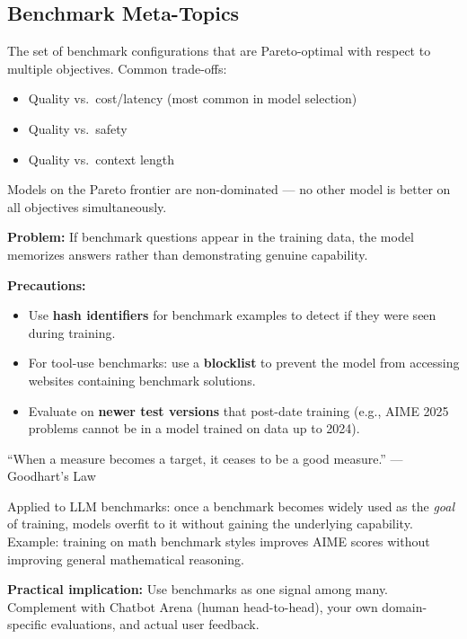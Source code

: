 \documentclass[11pt, a4paper]{article}
\begin{document}
\subsection{Benchmark Meta-Topics}

\begin{defbox}
The set of benchmark configurations that are Pareto-optimal with respect to multiple objectives. Common trade-offs:
\begin{itemize}[leftmargin=1.5em]
  \item Quality vs.\ cost/latency (most common in model selection)
  \item Quality vs.\ safety
  \item Quality vs.\ context length
\end{itemize}
Models on the Pareto frontier are non-dominated --- no other model is better on all objectives simultaneously.
\end{defbox}

\begin{warnbox}
\textbf{Problem:} If benchmark questions appear in the training data, the model memorizes answers rather than demonstrating genuine capability.

\textbf{Precautions:}
\begin{itemize}[leftmargin=1.5em]
  \item Use \textbf{hash identifiers} for benchmark examples to detect if they were seen during training.
  \item For tool-use benchmarks: use a \textbf{blocklist} to prevent the model from accessing websites containing benchmark solutions.
  \item Evaluate on \textbf{newer test versions} that post-date training (e.g., AIME 2025 problems cannot be in a model trained on data up to 2024).
\end{itemize}
\end{warnbox}

\begin{defbox}
``When a measure becomes a target, it ceases to be a good measure.'' --- Goodhart's Law

Applied to LLM benchmarks: once a benchmark becomes widely used as the \emph{goal} of training, models overfit to it without gaining the underlying capability. Example: training on math benchmark styles improves AIME scores without improving general mathematical reasoning.

\textbf{Practical implication:} Use benchmarks as one signal among many. Complement with Chatbot Arena (human head-to-head), your own domain-specific evaluations, and actual user feedback.
\end{defbox}
\end{document}
